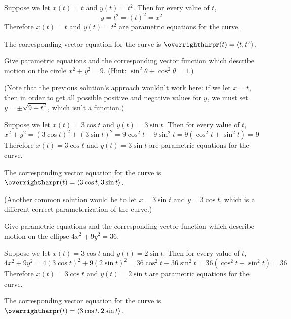 \documentclass[letterpaper, twoside, 12pt]{book}
\begin{document}
          \begin{solution}
  Suppose we let $x(t)=t$ and $y(t)=t^2$.
  Then for every value of $t$,
  \[
    y=t^2=(t)^2=x^2
  \]
  Therefore $x(t)=t$ and $y(t)=t^2$ are parametric equations
  for the curve.

  The corresponding vector equation for the curve is
  $\vect{r}(t)=\<t,t^2\>$.
          \end{solution}

          \begin{problem}
            Give parametric equations and the corresponding vector function
            which describe motion on the circle $x^2+y^2=9$.
            (Hint: $\sin^2 \theta + \cos^2 \theta = 1$.)
          \end{problem}

          \begin{solution}
  (Note that the previous solution's approach wouldn't work here: if we let
  $x=t$, then in order to get all possible positive and negative values
  for $y$, we must set $y=\pm\sqrt{9-t^2}$, which isn't a function.)

  Suppose we let $x(t)=3\cos t$ and $y(t)=3\sin t$.
  Then for every value of $t$,
  \[
    x^2+y^2
      =
    (3\cos t)^2+(3\sin t)^2
      =
    9\cos^2 t+9\sin^2 t
      =
    9(\cos^2 t+\sin^2 t)
      =
    9
  \]
  Therefore $x(t)=3\cos t$ and $y(t)=3\sin t$ are parametric equations
  for the curve.

  The corresponding vector equation for the curve is
  $\vect{r}(t)=\<3\cos t,3\sin t\>$.

  (Another common solution would be to let $x=3\sin t$ and $y=3\cos t$,
  which is a different correct parameterization of the curve.)
          \end{solution}

          \begin{problem}
            Give parametric equations and the corresponding vector function
            which describe motion on the ellipse $4x^2+9y^2=36$.
          \end{problem}

          \begin{solution}
  Suppose we let $x(t)=3\cos t$ and $y(t)=2\sin t$.
  Then for every value of $t$,
  \[
    4x^2+9y^2
      =
    4(3\cos t)^2+9(2\sin t)^2
      =
    36\cos^2 t+36\sin^2 t
      =
    36(\cos^2 t+\sin^2 t)
      =
    36
  \]
  Therefore $x(t)=3\cos t$ and $y(t)=2\sin t$ are parametric equations
  for the curve.

  The corresponding vector equation for the curve is
  $\vect{r}(t)=\<3\cos t,2\sin t\>$.
          \end{solution}
\end{document}
